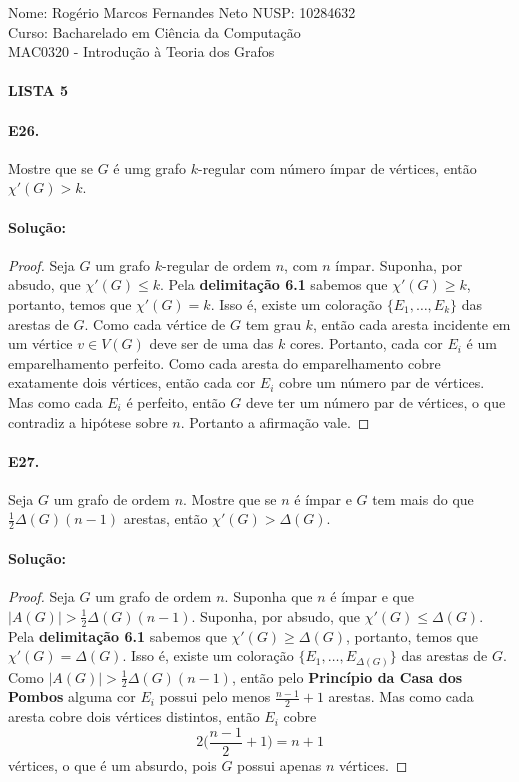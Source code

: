 \documentclass[11pt,a4paper,notitlepage]{exam}
\begin{document}
\begin{center}
    Nome: Rogério Marcos Fernandes Neto\hphantom{xxx} NUSP: 10284632\\
    Curso: Bacharelado em Ciência da Computação\\
    MAC0320 - Introdução à Teoria dos Grafos
    \paragraph{}
    \textbf{LISTA 5}
\end{center}
\paragraph*{E26.} Mostre que se $G$ é umg grafo $k$-regular com número
ímpar de vértices, então $\chi'(G) > k$.
\paragraph{Solução:}

\begin{proof}
 Seja $G$ um grafo $k$-regular de ordem $n$, com $n$ ímpar.  Suponha, por
    absudo, que $\chi'(G) \leq k$. Pela
\textbf{delimitação 6.1} sabemos que $\chi'(G) \geq k$,
    portanto, temos que $\chi'(G) = k$. Isso é, existe um coloração
$\{E_1, \dots, E_k\}$ das arestas de $G$. Como cada vértice de $G$ tem grau
$k$, então cada aresta incidente em um vértice $v\in V(G)$ deve ser de
uma das $k$ cores. Portanto, cada cor $E_i$ é um emparelhamento
perfeito. Como cada aresta do emparelhamento cobre exatamente dois
vértices, então cada cor $E_i$ cobre um número par de vértices. Mas como
cada $E_i$ é perfeito, então $G$ deve ter um número par de vértices, o
que contradiz a hipótese sobre $n$. Portanto a afirmação vale.
\end{proof}

\paragraph*{E27.} Seja $G$ um grafo de ordem $n$. Mostre que se $n$ é
ímpar e $G$ tem mais do que $\frac{1}{2}\Delta(G)(n-1)$ arestas, então
$\chi'(G) > \Delta(G)$.

\paragraph{Solução: }
\begin{proof}
    Seja $G$ um grafo de ordem $n$. Suponha que $n$ é ímpar e que $|A(G)|
    > \frac{1}{2}\Delta(G)(n-1)$. Suponha, por
    absudo, que $\chi'(G) \leq \Delta(G)$. Pela
    \textbf{delimitação 6.1} sabemos que $\chi'(G) \geq \Delta(G)$,
    portanto, temos que $\chi'(G) = \Delta(G)$. Isso é, existe um coloração
    $\{E_1, \dots, E_{\Delta(G)}\}$ das arestas de $G$. Como $|A(G)|
    > \frac{1}{2}\Delta(G)(n-1)$, então pelo \textbf{Princípio da Casa
    dos Pombos} alguma cor $E_i$ possui pelo menos $\frac{n-1}{2} +
    1$ arestas. Mas como cada aresta cobre dois vértices
    distintos, então $E_i$ cobre
    $$2  \bigg(\frac{n-1}{2} +  1\bigg) = n + 1 $$
    vértices, o que é um absurdo, pois $G$ possui apenas $n$
    vértices.
\end{proof}
\newpage
\end{document}
